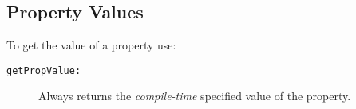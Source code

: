 \subsection{Property Values}
To get the value of a property use:
\begin{description}
\item[\texttt{{\small getPropValue:}}]
Always returns the \emph{compile-time} specified value of the property.
\end{description}

